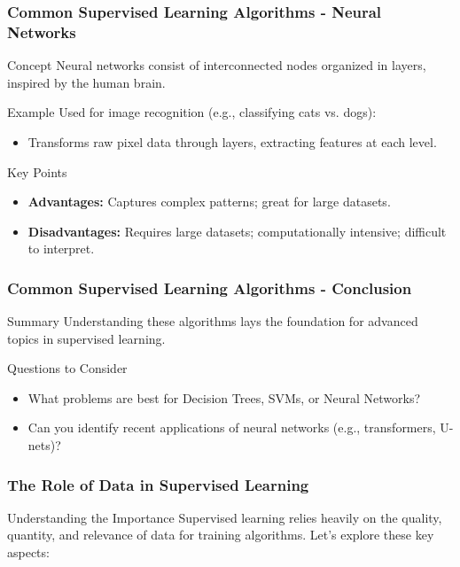 \documentclass[aspectratio=169]{beamer}
\begin{document}
\begin{frame}[fragile]
    \frametitle{Common Supervised Learning Algorithms - Neural Networks}
    \begin{block}{Concept}
        Neural networks consist of interconnected nodes organized in layers, inspired by the human brain.
    \end{block}

    \begin{block}{Example}
        Used for image recognition (e.g., classifying cats vs. dogs):
        \begin{itemize}
            \item Transforms raw pixel data through layers, extracting features at each level.
        \end{itemize}
    \end{block}

    \begin{block}{Key Points}
        \begin{itemize}
            \item \textbf{Advantages:} Captures complex patterns; great for large datasets.
            \item \textbf{Disadvantages:} Requires large datasets; computationally intensive; difficult to interpret.
        \end{itemize}
    \end{block}
\end{frame}

\begin{frame}[fragile]
    \frametitle{Common Supervised Learning Algorithms - Conclusion}
    \begin{block}{Summary}
        Understanding these algorithms lays the foundation for advanced topics in supervised learning.
    \end{block}

    \begin{block}{Questions to Consider}
        \begin{itemize}
            \item What problems are best for Decision Trees, SVMs, or Neural Networks?
            \item Can you identify recent applications of neural networks (e.g., transformers, U-nets)?
        \end{itemize}
    \end{block}
\end{frame}

\begin{frame}[fragile]
    \frametitle{The Role of Data in Supervised Learning}
    \begin{block}{Understanding the Importance}
        Supervised learning relies heavily on the quality, quantity, and relevance of data for training algorithms. Let's explore these key aspects:
    \end{block}
\end{frame}
\end{document}
